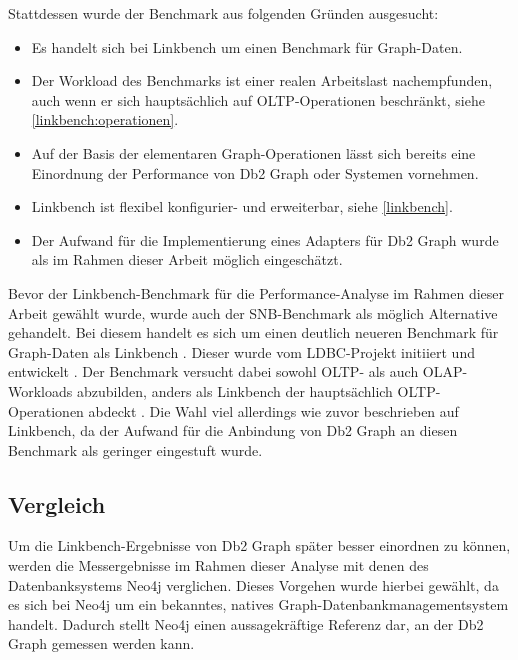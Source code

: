 Stattdessen wurde der Benchmark aus folgenden Gründen ausgesucht:
\begin{itemize}
    \item Es handelt sich bei Linkbench um einen Benchmark für Graph-Daten.
    \item Der Workload des Benchmarks ist einer realen Arbeitslast nachempfunden, auch wenn er sich hauptsächlich auf OLTP-Operationen beschränkt, siehe \autoref{linkbench:operationen}. 
    \item Auf der Basis der elementaren Graph-Operationen lässt sich bereits eine Einordnung der Performance von Db2 Graph oder Systemen vornehmen. 
    \item Linkbench ist flexibel konfigurier- und erweiterbar, siehe \autoref{linkbench}. 
    \item Der Aufwand für die Implementierung eines Adapters für Db2 Graph wurde als im Rahmen dieser Arbeit möglich eingeschätzt.
\end{itemize}
Bevor der Linkbench-Benchmark für die Performance-Analyse im Rahmen dieser Arbeit gewählt wurde, wurde auch der SNB-Benchmark als möglich Alternative gehandelt. Bei diesem  handelt es sich um einen deutlich neueren Benchmark für Graph-Daten als Linkbench \cite{snb_paper}. Dieser wurde vom LDBC-Projekt initiiert und entwickelt \cite{snb_paper}. Der Benchmark versucht dabei sowohl OLTP- als auch OLAP-Workloads abzubilden, anders als Linkbench der hauptsächlich OLTP-Operationen abdeckt \cite{snb_paper}. Die Wahl viel allerdings wie zuvor beschrieben auf Linkbench, da der Aufwand für die Anbindung von Db2 Graph an diesen Benchmark als geringer eingestuft wurde.  

\subsection{Vergleich}
Um die Linkbench-Ergebnisse von Db2 Graph später besser einordnen zu können, werden die Messergebnisse im Rahmen dieser Analyse mit denen des Datenbanksystems Neo4j verglichen. Dieses Vorgehen wurde hierbei gewählt, da es sich bei Neo4j um ein bekanntes, natives Graph-Datenbankmanagementsystem handelt. Dadurch stellt Neo4j einen aussagekräftige Referenz dar, an der Db2 Graph gemessen werden kann. 

